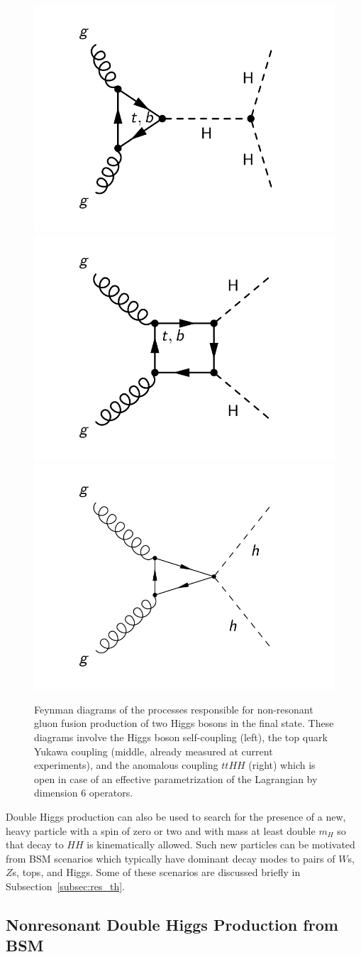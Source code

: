 \begin{figure}
\begin{center}
\includegraphics[width=.32\textwidth]{figures/intro/diHiggs_lambda.pdf}
\includegraphics[width=.32\textwidth]{figures/intro/diHiggs_yt.pdf}
\includegraphics[width=.32\textwidth]{figures/intro/diHiggs_c2.pdf}
\end{center}
\caption{
\label{fig:diHiggs_diagrams}
Feynman diagrams of the processes responsible for non-resonant gluon fusion production of two
Higgs bosons in the final state.
These diagrams involve the Higgs boson self-coupling (left), the top quark Yukawa coupling
(middle, already measured at current experiments),
and the anomalous coupling $ttHH$ (right) which is open in case of an effective
parametrization of the Lagrangian by dimension 6 operators.}
\end{figure}

Double Higgs production can also be used to search for the presence of a new, heavy particle
with a spin of zero or two and with
mass at least double $m_H$ so that decay to $HH$ is kinematically allowed. Such new particles
can be motivated from BSM scenarios which typically have dominant decay modes to pairs of
$W$s, $Z$s, tops, and Higgs. Some of these scenarios are discussed briefly in
Subsection~\ref{subsec:res_th}.

\subsection{Nonresonant Double Higgs Production from BSM\label{subsec:nonres_th}}

